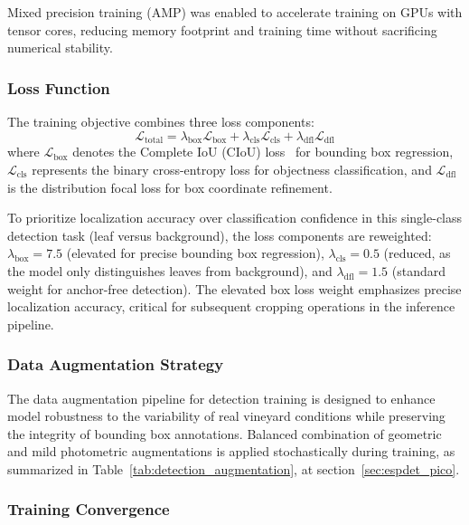 Mixed precision training (AMP) was enabled to accelerate training on GPUs with tensor cores, reducing memory footprint and training time without sacrificing numerical stability.

\subsubsection{Loss Function}

The training objective combines three loss components:
\begin{equation}
\mathcal{L}_{\text{total}} = \lambda_{\text{box}} \mathcal{L}_{\text{box}} + \lambda_{\text{cls}} \mathcal{L}_{\text{cls}} + \lambda_{\text{dfl}} \mathcal{L}_{\text{dfl}}
\end{equation}
where $\mathcal{L}_{\text{box}}$ denotes the Complete IoU (CIoU) loss~\cite{zheng2020distance} for bounding box regression, $\mathcal{L}_{\text{cls}}$ represents the binary cross-entropy loss for objectness classification, and $\mathcal{L}_{\text{dfl}}$ is the distribution focal loss for box coordinate refinement. 

To prioritize localization accuracy over classification confidence in this single-class detection task (leaf versus background), the loss components are reweighted: $\lambda_{\text{box}} = 7.5$ (elevated for precise bounding box regression), $\lambda_{\text{cls}} = 0.5$ (reduced, as the model only distinguishes leaves from background), and $\lambda_{\text{dfl}} = 1.5$ (standard weight for anchor-free detection). The elevated box loss weight emphasizes precise localization accuracy, critical for subsequent cropping operations in the inference pipeline.

\subsubsection*{Data Augmentation Strategy}

The data augmentation pipeline for detection training is designed to enhance model robustness to the variability of real vineyard conditions while preserving the integrity of bounding box annotations. Balanced combination of geometric and mild photometric augmentations is applied stochastically during training, as summarized in Table~\ref{tab:detection_augmentation}, at section~\ref{sec:espdet_pico}.



\subsubsection*{Training Convergence}

